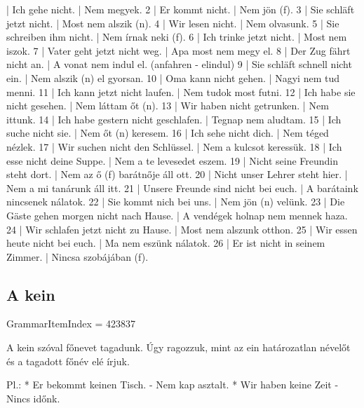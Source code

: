 \documentclass{article}
\newenvironment{desc}{\verbatim}{\endverbatim}
\newenvironment{exmp}{\verbatim}{\endverbatim}
\begin{document}
\begin{exmp}
1 | Ich gehe nicht. | Nem megyek.
2 | Er kommt nicht. | Nem jön (f).
3 | Sie schläft jetzt nicht. | Most nem alszik (n).
4 | Wir lesen nicht. | Nem olvasunk.
5 | Sie schreiben ihm nicht. | Nem írnak neki (f).
6 | Ich trinke jetzt nicht. | Most nem iszok.
7 | Vater geht jetzt nicht weg. | Apa most nem megy el.
8 | Der Zug fährt nicht an. | A vonat nem indul el. (anfahren - elindul)
9 | Sie schläft schnell nicht ein. | Nem alszik (n) el gyorsan.
10 | Oma kann nicht gehen. | Nagyi nem tud menni.
11 | Ich kann jetzt nicht laufen. | Nem tudok most futni.
12 | Ich habe sie nicht gesehen. | Nem láttam őt (n).
13 | Wir haben nicht getrunken. | Nem ittunk.
14 | Ich habe gestern nicht geschlafen. | Tegnap nem aludtam.
15 | Ich suche nicht sie. | Nem őt (n) keresem.
16 | Ich sehe nicht dich. | Nem téged nézlek.
17 | Wir suchen nicht den Schlüssel. | Nem a kulcsot keressük.
18 | Ich esse nicht deine Suppe. | Nem a te levesedet eszem.
19 | Nicht seine Freundin steht dort. | Nem az ő (f) barátnője áll ott.
20 | Nicht unser Lehrer steht hier. | Nem a mi tanárunk áll itt.
21 | Unsere Freunde sind nicht bei euch. | A barátaink nincsenek nálatok.
22 | Sie kommt nich bei uns. | Nem jön (n) velünk.
23 | Die Gäste gehen morgen nicht nach Hause. | A vendégek holnap nem mennek haza.
24 | Wir schlafen jetzt nicht zu Hause. | Most nem alszunk otthon.
25 | Wir essen heute nicht bei euch. | Ma nem eszünk nálatok.
26 | Er ist nicht in seinem Zimmer. | Nincsa szobájában (f).
\end{exmp}

\subsection{A kein}

GrammarItemIndex = 423837

\begin{desc}
A kein szóval főnevet tagadunk. Úgy ragozzuk, mint az ein határozatlan névelőt és a tagadott főnév elé írjuk.

Pl.: * Er bekommt keinen Tisch. - Nem kap asztalt.
* Wir haben keine Zeit - Nincs időnk.
\end{desc}
\end{document}
